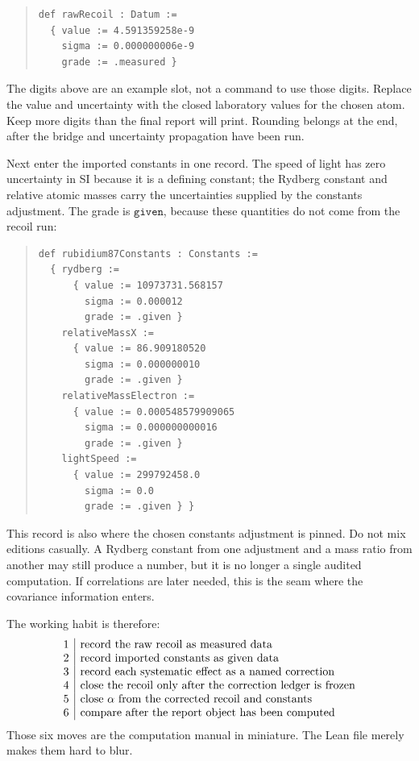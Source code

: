 \begin{quote}\small
\begin{verbatim}
def rawRecoil : Datum :=
  { value := 4.591359258e-9
    sigma := 0.000000006e-9
    grade := .measured }
\end{verbatim}
\end{quote}

The digits above are an example slot, not a command to use those digits. Replace the value and uncertainty with
the closed laboratory values for the chosen atom. Keep more digits than the final report will print. Rounding
belongs at the end, after the bridge and uncertainty propagation have been run.

Next enter the imported constants in one record. The speed of light has zero uncertainty in SI because it is a
defining constant; the Rydberg constant and relative atomic masses carry the uncertainties supplied by the
constants adjustment. The grade is \(\texttt{given}\), because these quantities do not come from the recoil run:

\begin{quote}\small
\begin{verbatim}
def rubidium87Constants : Constants :=
  { rydberg :=
      { value := 10973731.568157
        sigma := 0.000012
        grade := .given }
    relativeMassX :=
      { value := 86.909180520
        sigma := 0.000000010
        grade := .given }
    relativeMassElectron :=
      { value := 0.000548579909065
        sigma := 0.000000000016
        grade := .given }
    lightSpeed :=
      { value := 299792458.0
        sigma := 0.0
        grade := .given } }
\end{verbatim}
\end{quote}

This record is also where the chosen constants adjustment is pinned. Do not mix editions casually. A Rydberg
constant from one adjustment and a mass ratio from another may still produce a number, but it is no longer a
single audited computation. If correlations are later needed, this is the seam where the covariance information
enters.

The working habit is therefore:
\[
\begin{array}{c|l}
1 & \hbox{record the raw recoil as measured data}\\
2 & \hbox{record imported constants as given data}\\
3 & \hbox{record each systematic effect as a named correction}\\
4 & \hbox{close the recoil only after the correction ledger is frozen}\\
5 & \hbox{close \(\alpha\) from the corrected recoil and constants}\\
6 & \hbox{compare after the report object has been computed}
\end{array}
\]
Those six moves are the computation manual in miniature. The Lean file merely makes them hard to blur.
